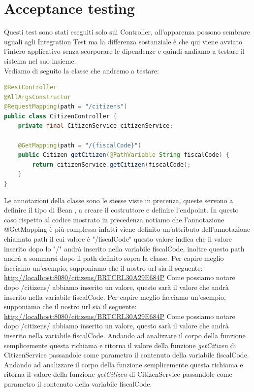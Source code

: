 \documentclass[a4paper,12pt,openany,oneside]{book}
\begin{document}
\section{Acceptance testing}
Questi test sono stati eseguiti solo sui Controller, all'apparenza possono sembrare uguali agli Integration Test ma la differenza sostanziale è che qui viene avviato l'intero applicativo senza scorporare le dipendenze e quindi andiamo a testare il sistema nel suo insieme.\\
Vediamo di seguito la classe che andremo a testare:
\begin{lstlisting}[language=Java]
@RestController
@AllArgsConstructor
@RequestMapping(path = "/citizens")
public class CitizenController {
    private final CitizenService citizenService;

    @GetMapping(path = "/{fiscalCode}")
    public Citizen getCitizen(@PathVariable String fiscalCode) {
        return citizenService.getCitizen(fiscalCode);
    }
}
\end{lstlisting}
Le annotazioni della classe sono le stesse viste in precenza, queste servono a definire il tipo di Bean , a creare il costruttore e definire l'endpoint. In questo caso rispetto al codice mostrato in precedenza notiamo che l'annotazione @GetMapping  è più complessa infatti viene definito un'attributo dell'annotazione chiamato path il cui valore è "/{fiscalCode}" questo valore indica che il valore inserito dopo lo "/" andrà inserito nella variabile fiscalCode, inoltre questo path andrà a sommarsi dopo il path definito sopra la classe.
Per capire meglio facciamo un'esempio, supponiamo che il nostro url sia il seguente:
\underline{http://localhost:8080/citizens/BRTCRL30A29E684P}
Come possiamo notare dopo /citizens/ abbiamo inserito un valore, questo sarà il valore che andrà inserito nella variabile fiscalCode.
Per capire meglio facciamo un'esempio, supponiamo che il nostro url sia il seguente:
\underline{http://localhost:8080/citizens/BRTCRL30A29E684P}
Come possiamo notare dopo /citizens/ abbiamo inserito un valore, questo sarà il valore che andrà inserito nella variabile fiscalCode.
Andando ad analizzare il corpo della funzione semplicemente questa richiama e ritorna il valore della funzione \textit{getCitizen} di CitizenService passandole come parametro il contenuto della variabile fiscalCode. Andando ad analizzare il corpo della funzione semplicemente questa richiama e ritorna il valore della funzione \textit{getCitizen} di CitizenService passandole come parametro il contenuto della variabile fiscalCode.\\
\end{document}
